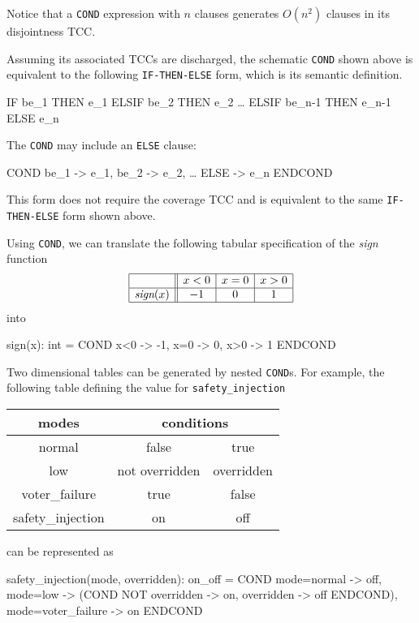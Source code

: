 Notice that a {\tt COND} expression with $n$ clauses generates $O(n^2)$
clauses in its disjointness TCC\@.  

Assuming its associated TCCs are discharged, the schematic {\tt COND}
shown above is equivalent to the following {\tt IF-THEN-ELSE} form,
which is its semantic definition.

\begin{pvsex}
  IF be\_1 THEN e\_1
  ELSIF be\_2 THEN e\_2
          \ldots
  ELSIF be\_n-1 THEN e\_n-1
  ELSE e\_n
\end{pvsex}

The {\tt COND} may include an {\tt ELSE} clause:
\begin{pvsex}
  COND
      be\_1 -> e\_1,
      be\_2 -> e\_2,
        \ldots
      ELSE -> e\_n
  ENDCOND
\end{pvsex}
This form does not require the coverage TCC and is equivalent to the
same {\tt IF-THEN-ELSE} form shown above.

Using {\tt COND}, we can translate the following tabular
specification of the \emph{sign} function
\[
\begin{array}{|c||c|c|c|}
\hline
 & x<0 & x=0 & x>0\\
\hline
\emph{sign}(x) & -1 & 0 & 1\\
\hline
\end{array}
\]
into
\begin{pvsex}
  sign(x): int = COND
                    x<0 -> -1, 
                    x=0 -> 0,
                    x>0 -> 1
                 ENDCOND
\end{pvsex}

Two dimensional tables can be generated by nested {\tt COND}s.  For
example, the following table defining the value for {\tt safety\_injection}
\begin{center}
\begin{tabular}{|c||c|c|}
\hline
modes & \multicolumn{2}{c|}{conditions} \\
\hline
\hline
normal & false & true\\
\hline
low & not overridden & overridden \\
\hline
voter\_failure & true & false\\
\hline
\hline
safety\_injection & on & off\\
\hline
\end{tabular}
\end{center}
can be represented as
\begin{pvsex}
  safety\_injection(mode, overridden): on\_off = 
    COND
      mode=normal -> off,
      mode=low -> (COND NOT overridden -> on, overridden -> off ENDCOND),
      mode=voter\_failure -> on
    ENDCOND
\end{pvsex}

